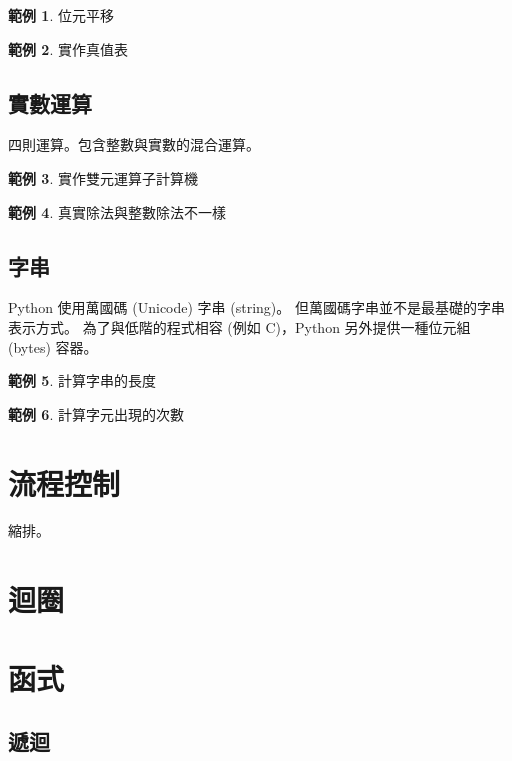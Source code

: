 \documentclass[a4paper,12pt]{book}
\theoremstyle{definition}
\newtheorem{example}{範例}[chapter]
\begin{document}
\begin{example}
位元平移
\end{example}

\begin{example}
實作真值表
\end{example}

\section{實數運算}

四則運算。包含整數與實數的混合運算。

\begin{example}
實作雙元運算子計算機
\end{example}

\begin{example}
真實除法與整數除法不一樣
\end{example}

\section{字串}

Python 使用萬國碼 (Unicode) 字串 (string)。
但萬國碼字串並不是最基礎的字串表示方式。
為了與低階的程式相容 (例如 C)，Python 另外提供一種位元組 (bytes) 容器。

\begin{example}
計算字串的長度
\end{example}

\begin{example}
計算字元出現的次數
\end{example}

\chapter{流程控制}
%
\label{c:flow}

縮排。

\chapter{迴圈}
%
\label{c:loop}

\chapter{函式}
%
\label{c:function}

\section{遞迴}
\end{document}
